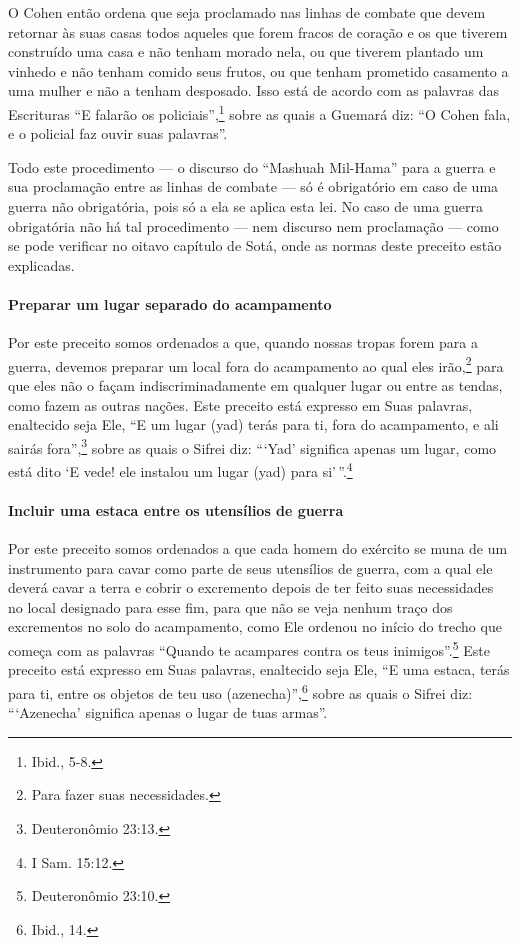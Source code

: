 O Cohen então ordena que seja proclamado nas linhas de combate que
devem retornar às suas casas todos aqueles que forem fracos de coração e
os que tiverem construído uma casa e não tenham morado nela, ou que
tiverem plantado um vinhedo e não tenham comido seus frutos, ou que
tenham prometido casamento a uma mulher e não a tenham desposado. Isso
está de acordo com as palavras das Escrituras ``E falarão os policiais'',\footnote{Ibid., 5-8.} sobre as quais a Guemará diz: ``O Cohen fala, e o
policial faz ouvir suas palavras''.

Todo este procedimento --- o discurso do ``Mashuah Mil-Hama'' para a
guerra e sua proclamação entre as linhas de combate --- só é obrigatório
em caso de uma guerra não obrigatória, pois só a ela se aplica esta lei.
No caso de uma guerra obrigatória não há tal procedimento --- nem
discurso nem proclamação --- como se pode verificar no oitavo capítulo
de Sotá, onde as normas deste preceito estão explicadas.

\paragraph{Preparar um lugar separado do acampamento}

Por este preceito somos ordenados a que, quando nossas tropas forem para a guerra, devemos preparar um local fora do acampamento ao qual
eles irão,\footnote{Para fazer suas necessidades.} para que eles não o façam
indiscriminadamente em qualquer lugar ou entre as tendas, como fazem as outras nações. Este preceito está expresso em Suas palavras, enaltecido seja Ele, ``E um lugar (yad) terás para ti, fora
do acampamento, e ali sairás fora'',\footnote{Deuteronômio 23:13.} sobre as quais
o Sifrei diz: ```Yad' significa apenas um lugar, como está dito `E vede!
ele instalou um lugar (yad) para si'\,''.\footnote{I Sam. 15:12.}

\paragraph{Incluir uma estaca entre os utensílios de guerra}

Por este preceito somos ordenados a que cada homem do exército se muna
de um instrumento para cavar como parte de seus utensílios de guerra,
com a qual ele deverá cavar a terra e cobrir o excremento depois de ter
feito suas necessidades no local designado para esse fim, para que não
se veja nenhum traço dos excrementos no solo do acampamento, como Ele
ordenou no início do trecho que começa com as palavras ``Quando te
acampares contra os teus inimigos''.\footnote{Deuteronômio 23:10.} Este preceito está expresso em
Suas palavras, enaltecido seja Ele, ``E uma estaca, terás para ti, entre
os objetos de teu uso (azenecha)'',\footnote{Ibid., 14.} sobre as quais o Sifrei
diz: ```Azenecha' significa apenas o lugar de tuas armas''.

